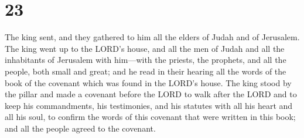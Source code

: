 \hypertarget{section-22}{%
\section{23}\label{section-22}}

 The king sent, and they gathered to him all the elders of
Judah and of Jerusalem.  The king went up to the LORD's
house, and all the men of Judah and all the inhabitants of Jerusalem
with him---with the priests, the prophets, and all the people, both
small and great; and he read in their hearing all the words of the book
of the covenant which was found in the LORD's house.  The
king stood by the pillar and made a covenant before the LORD to walk
after the LORD and to keep his commandments, his testimonies, and his
statutes with all his heart and all his soul, to confirm the words of
this covenant that were written in this book; and all the people agreed
to the covenant.

